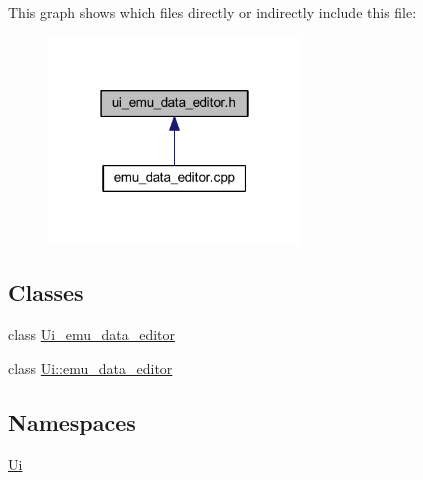 This graph shows which files directly or indirectly include this file\+:
\nopagebreak
\begin{figure}[H]
\begin{center}
\leavevmode
\includegraphics[width=190pt]{de/df7/a00418}
\end{center}
\end{figure}
\subsection*{Classes}
\begin{DoxyCompactItemize}
\item 
class \hyperlink{a00079}{Ui\+\_\+emu\+\_\+data\+\_\+editor}
\item 
class \hyperlink{a00009}{Ui\+::emu\+\_\+data\+\_\+editor}
\end{DoxyCompactItemize}
\subsection*{Namespaces}
\begin{DoxyCompactItemize}
\item 
 \hyperlink{a00145}{Ui}
\end{DoxyCompactItemize}
